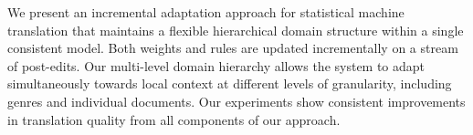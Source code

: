 We present an incremental adaptation approach for statistical machine translation that maintains a flexible hierarchical domain structure within a single consistent model. Both weights and rules are updated incrementally on a stream of post-edits. Our multi-level domain hierarchy allows the system to adapt simultaneously towards local context at different levels of granularity, including genres and individual documents. Our experiments show consistent improvements in translation quality from all components of our approach.
